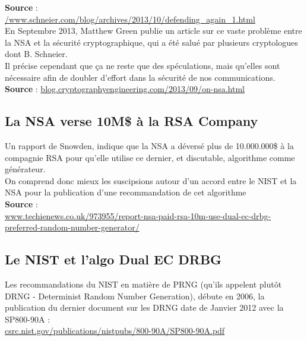 \documentclass{article}
\begin{document}
	\textbf{Source} :\\
	\href{https://www.schneier.com/blog/archives/2013/10/defending_again_1.html}
	{/www.schneier.com/blog/archives/2013/10/defending\_again\_1.html}\\
	
	
	En Septembre 2013, Matthew Green publie un article sur ce vaste
	problème entre la NSA et la sécurité cryptographique, qui
	a été salué par plusieurs cryptologues dont B. Schneier.\\
	
	Il précise cependant que ça ne reste que des spéculations, mais
	qu'elles sont nécessaire afin de doubler d'effort dans la sécurité
	de nos communications.\\

	\textbf{Source} :
	\href{http://blog.cryptographyengineering.com/2013/09/on-nsa.html}
	{blog.cryptographyengineering.com/2013/09/on-nsa.html}
	
	\subsection{La NSA verse 10M\$ à la RSA Company}

	Un rapport de Snowden, indique que la NSA a déversé plus de 10.000.000\$ à 
	la compagnie RSA pour qu'elle utilise ce dernier, et discutable, 
	algorithme comme générateur. \\
	On comprend donc mieux les suscipsions autour d'un accord entre le NIST et 
	la NSA pour la publication d'une recommandation de cet algorithme\\

	\textbf{Source} : \\
	\href{http://www.techienews.co.uk/973955/report-nsa-paid-rsa-10m-use-dual-ec-drbg-preferred-random-number-generator/}
	{www.techienews.co.uk/973955/report-nsa-paid-rsa-10m-use-dual-ec-drbg-preferred-random-number-generator/}\\

	\subsection{Le NIST et l'algo Dual EC DRBG}
	
	Les recommandations du NIST en matière de PRNG (qu'ils appelent plutôt 
	DRNG - Determinist Random Number Generation), débute en 2006, la 
	publication du dernier document sur les DRNG date de Janvier 2012 avec la 
	SP800-90A :\\
	\href{http://csrc.nist.gov/publications/nistpubs/800-90A/SP800-90A.pdf}
	{csrc.nist.gov/publications/nistpubs/800-90A/SP800-90A.pdf}\\
\end{document}
